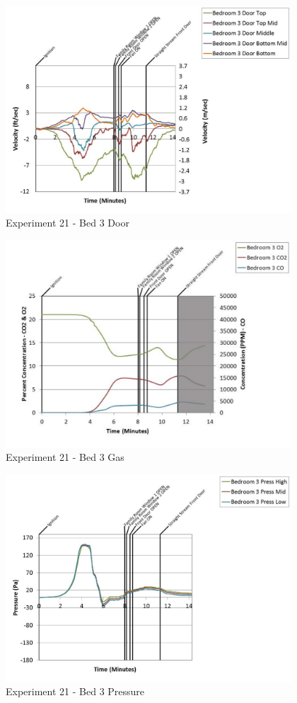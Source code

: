 \documentclass{article}
\begin{document}
\begin{appendices}
	\begin{figure}[h!]
		\centering
		\includegraphics[height=3.05in]{0_Images/Results_Charts/Exp_21_Charts/Bed3Door.pdf}
		\caption{Experiment 21 - Bed 3 Door}
	\end{figure}
 
	\clearpage

	\begin{figure}[h!]
		\centering
		\includegraphics[height=3.05in]{0_Images/Results_Charts/Exp_21_Charts/Bed3Gas.pdf}
		\caption{Experiment 21 - Bed 3 Gas}
	\end{figure}
 

	\begin{figure}[h!]
		\centering
		\includegraphics[height=3.05in]{0_Images/Results_Charts/Exp_21_Charts/Bed3Pressure.pdf}
		\caption{Experiment 21 - Bed 3 Pressure}
	\end{figure}
 

\end{appendices}
\end{document}
